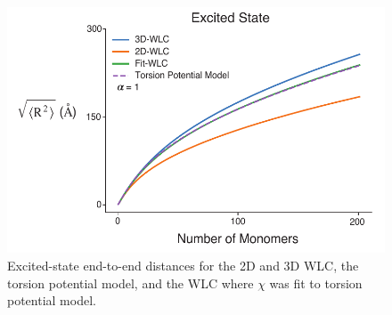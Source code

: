 \begin{figure}[hbt!]
    \centering
    \includegraphics{figures/append_tor_model/trip_wlc_fit.pdf}
    \caption{Excited-state end-to-end distances for the 2D and 3D WLC, the torsion potential model, and the WLC where $\chi$ was fit to torsion potential model.}
    \label{fig:e_wlc}
\end{figure}

\clearpage
